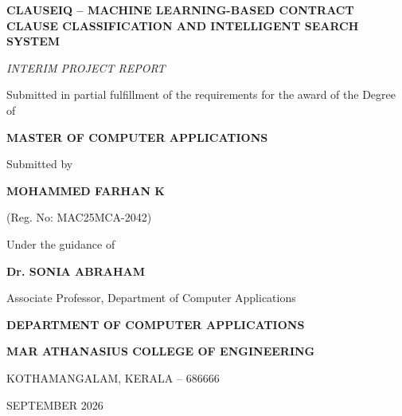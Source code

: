 \documentclass[12pt, a4paper]{report}
\begin{document}
\begin{titlepage}
\thispagestyle{empty}
\begin{center}
    \vspace*{0.2in}
    
    {\bfseries\fontsize{18}{22}\selectfont CLAUSEIQ -- MACHINE LEARNING-BASED CONTRACT CLAUSE CLASSIFICATION AND INTELLIGENT SEARCH SYSTEM\par}
    
    \vspace{0.35in}
    
    {\fontsize{13}{16}\selectfont\textit{INTERIM PROJECT REPORT}\par}
    
    \vspace{0.15in}
    
    {\fontsize{12}{15}\selectfont Submitted in partial fulfillment of the requirements for the award of the Degree of\par}
    \vspace{0.08in}
    {\bfseries\fontsize{14}{17}\selectfont MASTER OF COMPUTER APPLICATIONS\par}
    
    \vspace{0.35in}
    
    {\fontsize{12}{15}\selectfont Submitted by\par}
    \vspace{0.08in}
    {\bfseries\fontsize{14}{17}\selectfont MOHAMMED FARHAN K\par}
    {\fontsize{12}{15}\selectfont (Reg. No: MAC25MCA-2042)\par}
    
    \vspace{0.35in}
    
    {\fontsize{12}{15}\selectfont Under the guidance of\par}
    \vspace{0.08in}
    {\bfseries\fontsize{13}{16}\selectfont Dr. SONIA ABRAHAM\par}
    {\fontsize{12}{15}\selectfont Associate Professor, Department of Computer Applications\par}
    
    \vspace{0.45in}
    
    {\bfseries\fontsize{13}{16}\selectfont DEPARTMENT OF COMPUTER APPLICATIONS\par}
    {\bfseries\fontsize{12}{15}\selectfont MAR ATHANASIUS COLLEGE OF ENGINEERING\par}
    {\fontsize{11}{14}\selectfont KOTHAMANGALAM, KERALA -- 686666\par}
    \vspace{0.08in}
    {\fontsize{12}{15}\selectfont SEPTEMBER 2026\par}
    
\end{center}
\end{titlepage}
\end{document}
